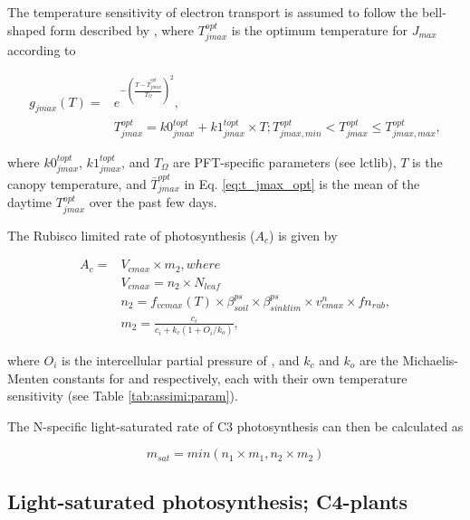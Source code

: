 The temperature sensitivity of electron transport is assumed to follow the bell-shaped form described by \cite{June:2004kj}, where $T_{jmax}^{opt}$ is the optimum temperature for $J_{max}$ according to \cite{Friend:2010je}  

\begin{subequations}
\begin{align}
g_{jmax}(T) =& e^{-\left({\frac{T-\bar{T}_{jmax}^{opt}}{T_{\Omega}}}\right)^2},\label{eq:t_jmax_opt}\\
&T_{jmax}^{opt} = k0_{jmax}^{topt} + k1_{jmax}^{topt} \times T; T_{jmax,min}^{opt} < T_{jmax}^{opt} \le T_{jmax,max}^{opt},
\end{align} 
\end{subequations} 

where $k0_{jmax}^{topt}$, $k1_{jmax}^{topt}$, and $T_{\Omega}$ are PFT-specific parameters (see lctlib), $T$ is the canopy temperature, and $\bar{T}_{jmax}^{opt}$ in Eq. \ref{eq:t_jmax_opt} is the mean of the daytime $T_{jmax}^{opt}$ over the past few days.

The Rubisco limited rate of photosynthesis ($A_c$) is given by 

\begin{subequations}\label{eq:vcmax}
\begin{align}
A_c=& V_{cmax} \times m_2, where \\
&V_{cmax} = n_2 \times N_{leaf} \\
&n_2 =  f_{vcmax}(T) \times \beta_{soil}^{ps} \times \beta_{sinklim}^{ps} \times v_{cmax}^n \times fn_{rub}, \\
&m_2 = \frac{c_i}{c_i + k_c (1+O_i/k_o)},
\end{align} 
\end{subequations} 

where $O_i$ is the intercellular partial pressure of , and $k_c$ and $k_o$ are the Michaelis-Menten constants for  and  respectively, each with their own temperature sensitivity (see Table \ref{tab:assimi:param}). 

The N-specific light-saturated rate of C3 photosynthesis can then be calculated as 

\begin{equation}
m_{sat} = min(n_1 \times m_1, n_2 \times m_2)
\end{equation}

\subsection{Light-saturated photosynthesis; C4-plants}

